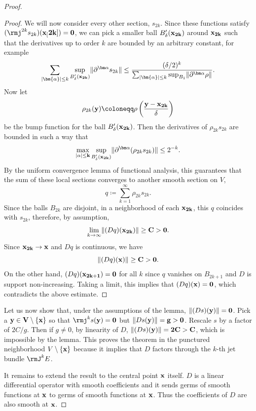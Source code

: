 \begin{proof}
\begin{proof}
        We will now consider every other section, $s_{2k}$. Since these functions satisfy $(\rmj^{2k}s_{2k})(\bf{x}_[2k])=0$, we can pick a smaller ball $B_{\delta}'(\bf{x}_{2k})$ around $\bf{x}_{2k}$ such that the derivatives up to order $k$ are bounded by an arbitrary constant, for example 
        \[\sum_{|\bm{\alpha}|\leq k} \sup_{B_\delta'(\bf{x}_{2k})}\lVert\partial^{\bm\alpha}s_{2k}\rVert\leq \frac{(\delta/2)^k}{\sum_{|\bm{\alpha}|\leq k}\sup_{B_1} \lVert\partial^{\bm\alpha}\rho\rVert}.\]
        Now let 
        \[\rho_{2k}(\bf{y})\coloneqq \rho\left(\frac{\bf{y}-\bf{x}_{2k}}{\delta}\right)\]
        be the bump function for the ball $B_\delta'(\bf{x}_{2k})$. Then the derivatives of $\rho_{2k}s_{2k}$ are bounded in such a way that 
        \[\max_{|\bf{\alpha}|\leq k}\sup_{B_\delta'(\bf{x}_{2k})}\lVert\partial^{\bm\alpha}(\rho_{2k}s_{2k})\rVert\leq 2^{-k}.\]
        By the uniform convergence lemma of functional analysis, this guarantees that the sum of these local sections converges to another smooth section on $V$,
        \[q\coloneqq \sum_{k=1}^\infty \rho_{2k}s_{2k}.\]
        Since the balls $B_{2k}$ are disjoint, in a neighborhood of each $\bf{x}_{2k}$, this $q$ coincides with $s_{2k}$, therefore, by assumption, 
        \[\lim_{k\to\infty}\lVert(Dq)(\bf{x}_{2k})\rVert\geq C>0.\]
        Since $\bf{x}_{2k}\to\bf{x}$ and $Dq$ is continuous, we have 
        \[\lVert (Dq)(\bf{x})\rVert\geq C>0.\]
        On the other hand, $(Dq)(\bf{x}_{2k+1})=0$ for all $k$ since $q$ vanishes on $B_{2k+1}$ and $D$ is support non-increasing. Taking a limit, this implies that $(Dq)(\bf{x})=0$, which contradicts the above estimate.
    \end{proof}
    Let us now show that, under the assumptions of the lemma, $\lVert (Ds)(\bf{y})\rVert=0$. Pick a $\bf{y}\in V\setminus\{\bf{x}\}$ so that $\rmj^ks(\bf{y})=0$ but $\lVert Ds(\bf{y})\rVert=g>0$. Rescale $s$ by a factor of $2C/g$. Then if $g\neq 0$, by linearity of $D$, $\lVert(Ds)(\bf{y})\rVert=2C>C$, which is impossible by the lemma. This proves the theorem in the punctured neighborhood $V\setminus\{\bf{x}\}$ because it implies that $D$ factors through the $k$-th jet bundle $\rmJ^kE$.

    It remains to extend the result to the central point $\bf{x}$ itself. $D$ is a linear differential operator with smooth coefficients and it sends germs of smooth functions at $\bf{x}$ to germs of smooth functions at $\bf{x}$. Thus the coefficients of $D$ are also smooth at $\bf{x}$.
\end{proof}

